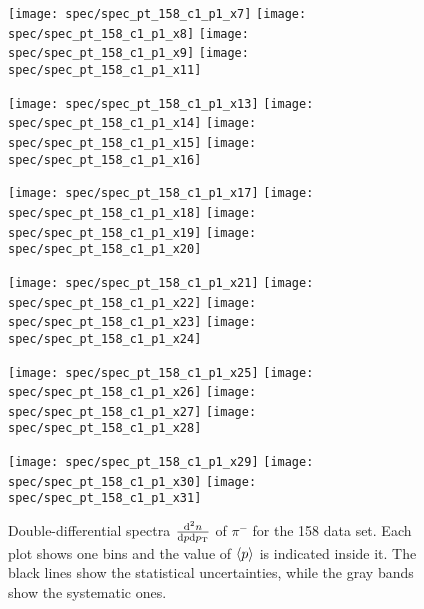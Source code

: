 \begin{figure}[!ht]
  \centering

  \texttt{[image: spec/spec\_pt\_158\_c1\_p1\_x7]}
  \texttt{[image: spec/spec\_pt\_158\_c1\_p1\_x8]}
  \texttt{[image: spec/spec\_pt\_158\_c1\_p1\_x9]}
  \texttt{[image: spec/spec\_pt\_158\_c1\_p1\_x11]}

  \texttt{[image: spec/spec\_pt\_158\_c1\_p1\_x13]}
  \texttt{[image: spec/spec\_pt\_158\_c1\_p1\_x14]}
  \texttt{[image: spec/spec\_pt\_158\_c1\_p1\_x15]}
  \texttt{[image: spec/spec\_pt\_158\_c1\_p1\_x16]}

  \texttt{[image: spec/spec\_pt\_158\_c1\_p1\_x17]}
  \texttt{[image: spec/spec\_pt\_158\_c1\_p1\_x18]}
  \texttt{[image: spec/spec\_pt\_158\_c1\_p1\_x19]}
  \texttt{[image: spec/spec\_pt\_158\_c1\_p1\_x20]}

  \texttt{[image: spec/spec\_pt\_158\_c1\_p1\_x21]}
  \texttt{[image: spec/spec\_pt\_158\_c1\_p1\_x22]}
  \texttt{[image: spec/spec\_pt\_158\_c1\_p1\_x23]}
  \texttt{[image: spec/spec\_pt\_158\_c1\_p1\_x24]}

  \texttt{[image: spec/spec\_pt\_158\_c1\_p1\_x25]}
  \texttt{[image: spec/spec\_pt\_158\_c1\_p1\_x26]}
  \texttt{[image: spec/spec\_pt\_158\_c1\_p1\_x27]}
  \texttt{[image: spec/spec\_pt\_158\_c1\_p1\_x28]}

  \texttt{[image: spec/spec\_pt\_158\_c1\_p1\_x29]}
  \texttt{[image: spec/spec\_pt\_158\_c1\_p1\_x30]}
  \texttt{[image: spec/spec\_pt\_158\_c1\_p1\_x31]}

  \caption{Double-differential spectra $\frac{\text{d}^2n}{\text{d}p\text{d}p_\text{T}}$
    of $\pi^-$ for the 158 \GeVc data set. Each plot shows one \pp bins and the value
    of $\langle p\rangle$ is indicated inside it. The black lines show the statistical
    uncertainties, while the gray bands show the systematic ones.}
  \label{fig:hadron:spec:dedx:all158:c1p1}
\end{figure}

